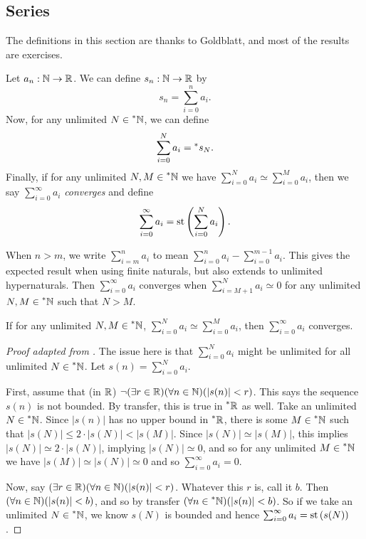 \subsection{Series}
The definitions in this section are thanks to Goldblatt, and most of the results are exercises.

Let $a_n: \mathbb{N} \to \mathbb{R}$. We can define $s_n: \mathbb{N} \to \mathbb{R}$ by 
\[ s_n = \sum_{i=0}^n a_i. \]
Now, for any unlimited $N \in \prescript{*}{}{\mathbb{N}}$, we can define
\[ \sum_{i=0}^N a_i = \prescript{*}{}{s_N}. \]
Finally, if for any unlimited $N, M \in \prescript{*}{}{\mathbb{N}}$ we have $\sum_{i=0}^N a_i \simeq \sum_{i=0}^M a_i$, then we say $\sum_{i=0}^\infty a_i$ \textit{converges} and define
\[ \sum_{i=0}^\infty a_i = \operatorname{st}\left(\sum_{i=0}^N a_i\right). \] 

When $n > m$, we write $\sum_{i=m}^n a_i$ to mean $\sum_{i=0}^n a_i - \sum_{i=0}^{m-1} a_i$. This gives the expected result when using finite naturals, but also extends to unlimited hypernaturals. Then $\sum_{i=0}^\infty a_i$ converges when $\sum_{i=M+1}^N a_i \simeq 0$ for any unlimited $N, M \in \prescript{*}{}{\mathbb{N}}$ such that $N > M$.

\begin{thm}
    If for any unlimited $N, M \in \prescript{*}{}{\mathbb{N}}$, $\sum_{i=0}^N a_i \simeq \sum_{i=0}^M a_i$, then $\sum_{i=0}^\infty a_i$ converges.
\end{thm}

\begin{proof}[Proof adapted from ]
    The issue here is that $\sum_{i=0}^N a_i$ might be unlimited for all unlimited $N \in \prescript{*}{}{\mathbb{N}}$. Let $s(n) = \sum_{i=0}^N a_i$. 
    
    First, assume that (in $\mathbb{R}$) $\neg (\exists r \in \mathbb{R}) (\forall n \in \mathbb{N})(|s(n)| < r)$. This says the sequence $s(n)$ is not bounded. By transfer, this is true in $\prescript{*}{}{\mathbb{R}}$ as well. Take an unlimited $N \in \prescript{*}{}{\mathbb{N}}$. Since $|s(n)|$ has no upper bound in $\prescript{*}{}{\mathbb{R}}$, there is some $M \in \prescript{*}{}{\mathbb{N}}$ such that $|s(N)| \leq 2 \cdot |s(N)| < |s(M)|$. Since $|s(N)| \simeq |s(M)|$, this implies $|s(N)| \simeq 2 \cdot |s(N)|$, implying $|s(N)| \simeq 0$, and so for any unlimited $M \in \prescript{*}{}{\mathbb{N}}$ we have $|s(M)| \simeq |s(N)| \simeq 0$ and so $\sum_{i=0}^\infty a_i = 0$.

    Now, say $(\exists r \in \mathbb{R}) (\forall n \in \mathbb{N})(|s(n)| < r)$. Whatever this $r$ is, call it $b$. Then $(\forall n \in \mathbb{N})(|s(n)| < b)$, and so by transfer $(\forall n \in \prescript{*}{}{\mathbb{N}})(|s(n)| < b)$. So if we take an unlimited $N \in \prescript{*}{}{\mathbb{N}}$, we know $s(N)$ is bounded and hence $\sum_{i=0}^\infty a_i = \operatorname{st}\left(s(N)\right)$.
\end{proof}


